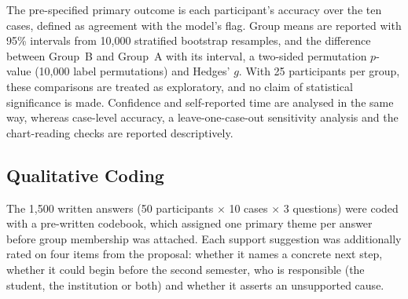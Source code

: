 The pre-specified primary outcome is each participant's accuracy over the ten cases, defined as
agreement with the model's flag. Group means are reported with 95\% intervals from 10,000 stratified
bootstrap resamples, and the difference between Group~B and Group~A with its interval, a two-sided
permutation $p$-value (10,000 label permutations) and Hedges' $g$. With 25 participants per group,
these comparisons are treated as exploratory, and no claim of statistical significance is made.
Confidence and self-reported time are analysed in the same way, whereas case-level accuracy, a leave-one-case-out sensitivity
analysis and the chart-reading checks are reported descriptively.

\subsection{Qualitative Coding}
\label{sec:coding}

The 1,500 written answers (50 participants $\times$ 10 cases $\times$ 3 questions) were coded with a
pre-written codebook, which assigned one primary theme per answer before group membership was
attached. Each support suggestion was additionally rated on four items from the proposal: whether it
names a concrete next step, whether it could begin before the second semester, who is responsible
(the student, the institution or both) and whether it asserts an unsupported cause.

